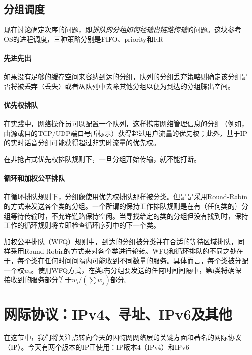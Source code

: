 \documentclass[]{report}
\begin{document}
		\subsection{分组调度}
		现在讨论确定次序的问题，即\textit{排队的分组如何经输出链路传输}的问题。这块参考OS的进程调度，三种策略分别是FIFO、priority和RR
			\paragraph{先进先出}
			如果没有足够的缓存空间来容纳到达的分组，队列的分组丢弃策略则确定该分组是否将被丢弃（丢失）或者从队列中去除其他分组以便为到达的分组腾出空间。
			\paragraph{优先权排队}
			在实践中，网络操作员可以配置一个队列，这样携带网络管理信息的分组（例如，由源或目的TCP/UDP端口号所标示）获得超过用户流量的优先权；此外，基于IP的实时话音分组可能获得超过非实时流量的优先权。\par
			在非抢占式优先权排队规则下，一旦分组开始传输，就不能打断。
			\paragraph{循环和加权公平排队}
			在循环排队规则下，分组像使用优先权排队那样被分类。但是是采用Round-Robin的方式来发送各个类的分组。一个所谓的保持工作排队规则是在有（任何类的）分组等待传输时，不允许链路保持空闲。当寻找给定的类的分组但没有找到时，保持工作的循环规则将立即检查循环序列中的下一个类。\par
			加权公平排队（WFQ）规则中，到达的分组被分类并在合适的等待区域排队，同样采用Round-Robin的方式来对各个类进行轮转。WFQ和循环排队的不同之处在于，每个类在任何时间间隔内可能收到不同数量的服务。具体而言，每个类被分配一个权$w_i$。使用WFQ方式，在类i有分组要发送的任何时间间隔中，第i类将确保接收到的服务部分等于$w_i/(\sum w_j)$部分。
	\section{网际协议：IPv4、寻址、IPv6及其他}
	在这节中，我们将关注点转向今天的因特网网络层的关键方面和著名的网际协议（IP）。今天有两个版本的IP正使用：IP版本4（IPv4）和IPv6
\end{document}
